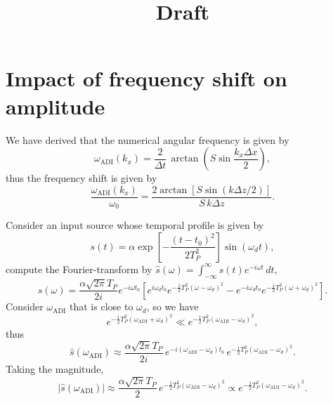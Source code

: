 \documentclass{article}
\title{Draft}
\numberwithin{figure}{section}
\begin{document}
\maketitle

\section{Impact of frequency shift on amplitude}

We have derived that the numerical angular frequency is given by
\begin{equation}
    \omega_{\mathrm{ADI}}(k_x) = \frac{2}{\Delta t}\,\arctan\!\left(S\sin\frac{k_x\Delta x}{2}\right),
    \label{eq:adi-dispersion-relation}
\end{equation}
thus the frequency shift is given by
\begin{equation}
    \frac{\omega_{\mathrm{ADI}}(k_x)}{\omega_0} = \frac{2\arctan\!\left[S\sin(k\Delta z/2)\right]}{S\,k\Delta z}.
\end{equation}

Consider an input source whose temporal profile is given by
\begin{equation}
    s(t)= \alpha \exp\left[-\frac{(t-t_0)^2}{2T_P^2}\right] \sin(\omega_d t),
\end{equation}
compute the Fourier-transform by $\hat s(\omega)=\int_{-\infty}^{\infty}s(t)e^{-i\omega t}\,dt$,
\begin{equation}
    \hat s(\omega) = \frac{\alpha\sqrt{2\pi}T_P}{2i} e^{-i\omega t_0} \left[ e^{i\omega_d t_0} e^{-\frac12T_P^2(\omega-\omega_d)^2} - e^{-i\omega_d t_0} e^{-\frac12T_P^2(\omega+\omega_d)^2} \right].
\end{equation}
Consider $\omega_{\mathrm{ADI}}$ that is close to $\omega_d$, so we have
\begin{equation}
    e^{-\frac12T_P^2(\omega_{\mathrm{ADI}}+\omega_d)^2} \ll e^{-\frac12T_P^2(\omega_{\mathrm{ADI}}-\omega_d)^2},
\end{equation}
thus
\begin{equation}
    \hat s(\omega_{\mathrm{ADI}}) \approx \frac{\alpha\sqrt{2\pi}T_P}{2i}\, e^{-i(\omega_{\mathrm{ADI}}-\omega_d)t_0}\, e^{-\frac12 T_P^2(\omega_{\mathrm{ADI}}-\omega_d)^2}.
\end{equation}
Taking the magnitude,
\begin{equation}
    \bigl|\hat s(\omega_{\mathrm{ADI}})\bigr| \approx \frac{\alpha\sqrt{2\pi}T_P}{2}\, e^{-\frac12 T_P^2(\omega_{\mathrm{ADI}}-\omega_d)^2} \propto e^{-\frac12 T_P^2(\omega_{\mathrm{ADI}}-\omega_d)^2}.
\end{equation}
\end{document}
